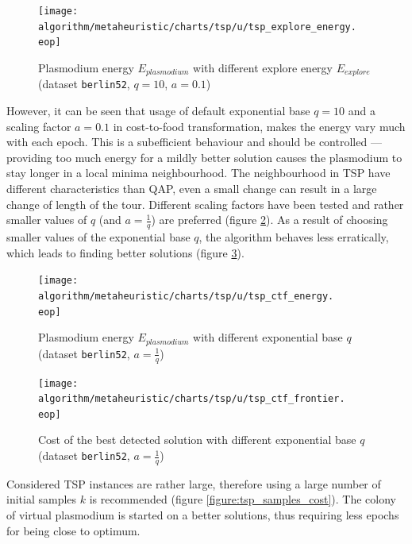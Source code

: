 \documentclass[english,a4paper,twoside]{ppfcmthesis}
\begin{document}
\begin{figure}
  \centering

  \texttt{[image: algorithm/metaheuristic/charts/tsp/u/tsp\_explore\_energy.\\eop]}

  \caption{Plasmodium energy $E_{plasmodium}$ with different explore energy $E_{explore}$ (dataset \texttt{berlin52}, $q=10$, $a=0.1$)}
  \label{figure:tsp_explore_energy}
\end{figure}

However, it can be seen that usage of default exponential base $q=10$ and a scaling factor $a=0.1$ in cost-to-food transformation, makes the energy vary much with each epoch. This is a subefficient behaviour and should be controlled --- providing too much energy for a mildly better solution causes the plasmodium to stay longer in a local minima neighbourhood. The neighbourhood in TSP have different characteristics than QAP, even a small change can result in a large change of length of the tour. Different scaling factors have been tested and rather smaller values of $q$ (and $a=\frac{1}{q}$) are preferred (figure \ref{figure:tsp_ctf_energy}). As a result of choosing smaller values of the exponential base $q$, the algorithm behaves less erratically, which leads to finding better solutions (figure \ref{figure:tsp_ctf_frontier}). 

\begin{figure}
  \centering

  \texttt{[image: algorithm/metaheuristic/charts/tsp/u/tsp\_ctf\_energy.\\eop]}

  \caption{Plasmodium energy $E_{plasmodium}$ with different exponential base $q$ (dataset \texttt{berlin52}, $a=\frac{1}{q}$)}
  \label{figure:tsp_ctf_energy}
\end{figure}

\begin{figure}
  \centering

  \texttt{[image: algorithm/metaheuristic/charts/tsp/u/tsp\_ctf\_frontier.\\eop]}

  \caption{Cost of the best detected solution with different exponential base $q$ (dataset \texttt{berlin52}, $a=\frac{1}{q}$)}
  \label{figure:tsp_ctf_frontier}
\end{figure}

Considered TSP instances are rather large, therefore using a large number of initial samples $k$ is recommended (figure \ref{figure:tsp_samples_cost}). The colony of virtual plasmodium is started on a better solutions, thus requiring less epochs for being close to optimum.
\end{document}

